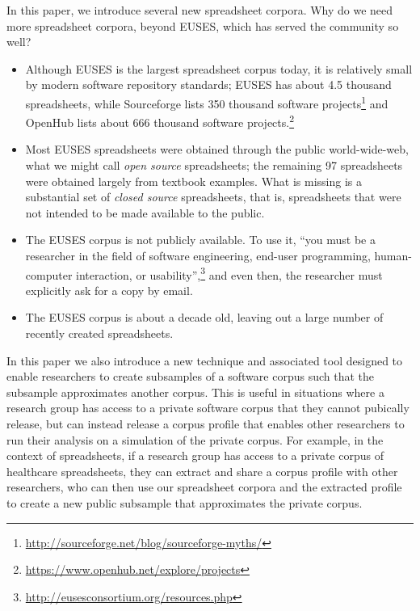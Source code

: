 \documentclass[conference]{IEEEtran}
\begin{document}
In this paper, we introduce several new spreadsheet corpora.
Why do we need more spreadsheet corpora, beyond EUSES, which has served the community so well?
\begin{itemize}
  \item
  	Although EUSES is the largest spreadsheet corpus today, it is relatively small by
  	modern software repository standards; EUSES has about 4.5 thousand spreadsheets, while 
  	Sourceforge lists 350 thousand software projects\footnote{\url{http://sourceforge.net/blog/sourceforge-myths/}} 
  	and OpenHub lists about 666 thousand
  	software projects.\footnote{\url{https://www.openhub.net/explore/projects}}
  \item
  	Most EUSES spreadsheets were obtained through the public world-wide-web,
  	what we might call \emph{open source} spreadsheets; the remaining 97 spreadsheets were obtained
  	largely from textbook examples. What is missing is a substantial set of \emph{closed source} spreadsheets, that is,
  	spreadsheets that were not intended to be made available to the public.
  \item
  	The EUSES corpus is not publicly available. To use it, ``you must be a researcher in the field of 
  	software engineering, end-user programming, human-computer interaction, or 
  	usability'',\footnote{\url{http://eusesconsortium.org/resources.php}} 
  	and even then, the researcher must explicitly ask for a copy by email.
  \item
  	The EUSES corpus is about a decade old, leaving out a large number of recently
  	created spreadsheets.
\end{itemize}

In this paper we also introduce a new technique and associated tool designed to enable researchers 
to create subsamples of a software corpus such that the subsample approximates 
another corpus.
This is useful in situations where a research group has access to a private software
corpus that they cannot pubically release, but can instead release a corpus profile
that enables other researchers to run their analysis on a simulation of the private corpus.
For example, in the context of spreadsheets, if a research group has access to 
a private corpus of healthcare spreadsheets, they can extract and share a corpus profile
with other researchers, who can then use our spreadsheet corpora and the extracted profile to create
a new public subsample that approximates the private corpus.
\end{document}
